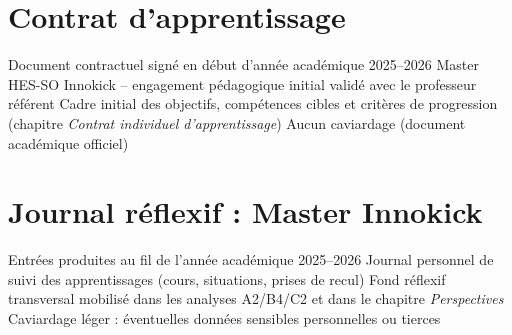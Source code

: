 ﻿%
%
%
%    
%
%

\chapter{Contrat d'apprentissage}
\label{annex:contrat-apprentissage}
\annexefiche
  {Document contractuel signé en début d'année académique 2025--2026}
  {Master HES-SO Innokick -- engagement pédagogique initial validé avec le professeur référent}
  {Cadre initial des objectifs, compétences cibles et critères de progression (chapitre \textit{Contrat individuel d'apprentissage})}
  {Aucun caviardage (document académique officiel)}








\chapter{Journal réflexif : Master Innokick}
\label{annex:journal-reflexif}
\annexefiche
  {Entrées produites au fil de l'année académique 2025--2026}
  {Journal personnel de suivi des apprentissages (cours, situations, prises de recul)}
  {Fond réflexif transversal mobilisé dans les analyses A2/B4/C2 et dans le chapitre \textit{Perspectives}}
  {Caviardage léger : éventuelles données sensibles personnelles ou tierces}


